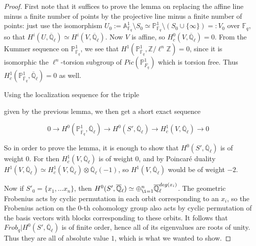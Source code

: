 \documentclass{ucbthesis}
\theoremstyle{definition}
\theoremstyle{theorem}
\begin{document}
\begin{proof}
First note that it suffices to prove the lemma on replacing the affine line minus a finite number of points by the projective line minus a finite number of points: just use the isomorphism $ U_{0}:= \mathbb{A}^{1}_{\mathbb{F}_q}\setminus S_{0} \simeq \mathbb{P}_{\mathbb{F}_{q}}^{1}\setminus (S_{0}\cup\{\infty\})=:V_{0}$ over $\mathbb{F}_q$, so that $H^{i}(U,\overline{\mathbb{Q}}_{\ell}) \simeq H^{i}(V,\overline{\mathbb{Q}}_{\ell})$. Now $V$ is affine, so $H^{0}_{c}(V,\overline{\mathbb{Q}}_{\ell}) = 0$. From the Kummer sequence on $\mathbb{P}^{1}_{\overline{\mathbb{F}}_{q}}$, we see that  $H^{1}(\mathbb{P}^{1}_{\overline{\mathbb{F}}_q}, 
  \mathbb{Z}/\ell^{n}\mathbb{Z})=0$, since it is isomorphic the $\ell^{n}$-torsion subgroup of $Pic(\mathbb{P}^{1}_{\overline{F}_{q}})$ which is torsion free. Thus $H^{1}_{c}(\mathbb{P}^{1}_{\overline{\mathbb{F}}_q},\overline{\mathbb{Q}}_{\ell}) = 0$ as well. 

Using the localization sequence for the triple 
 given by the previous lemma, we then get a short exact sequence 
 
 
  $$0 \rightarrow  H^{0}(\mathbb{P}^{1}_{\overline{\mathbb{F}}_q},\overline{\mathbb{Q}}_{\ell}) \rightarrow H^{0}(S',\overline{\mathbb{Q}}_{\ell}) \rightarrow H^{1}_{c}(V,\overline{\mathbb{Q}}_{\ell}) \rightarrow 0 $$

\noindent So in order to prove the lemma, it is enough to show that $H^{0}(S',\overline{\mathbb{Q}}_{\ell})$ is of weight $0$. For then $H^{1}_{c}(V, \overline{\mathbb{Q}}_{\ell})$ is of weight $0$, and by Poincar\'{e} duality $H^{1}(V,\overline{\mathbb{Q}}_{\ell}) \simeq H^{1}_{c}(V, \overline{\mathbb{Q}}_{\ell})\otimes \overline{\mathbb{Q}}_{\ell}(-1)$, so $H^{1}(V,\overline{\mathbb{Q}}_{\ell})$ would be of weight $-2$. 

Now if $S'_{0} = \{x_{1},\ldots x_{n}\}$, then $H^{0}(S',\overline{\mathbb{Q}}_{\ell})\simeq \oplus_{\i=1}^{n}\overline{\mathbb{Q}}_{\ell}^{deg(x_{i})}$. The geometric Frobenius acts by cyclic
 permutation in each orbit corresponding to an $x_{i}$, so the Frobenius action on the $0$-th cohomology group also
  acts by cyclic permutation of the basis vectors with blocks corresponding to these orbits. It follows that $Frob_{q}|H^{0}(S',\overline{\mathbb{Q}}_{\ell})$ is of finite order, hence all of its eigenvalues are roots of unity. Thus they are all of absolute value $1$, which is what we wanted to show. 
  
\end{proof}
\end{document}
